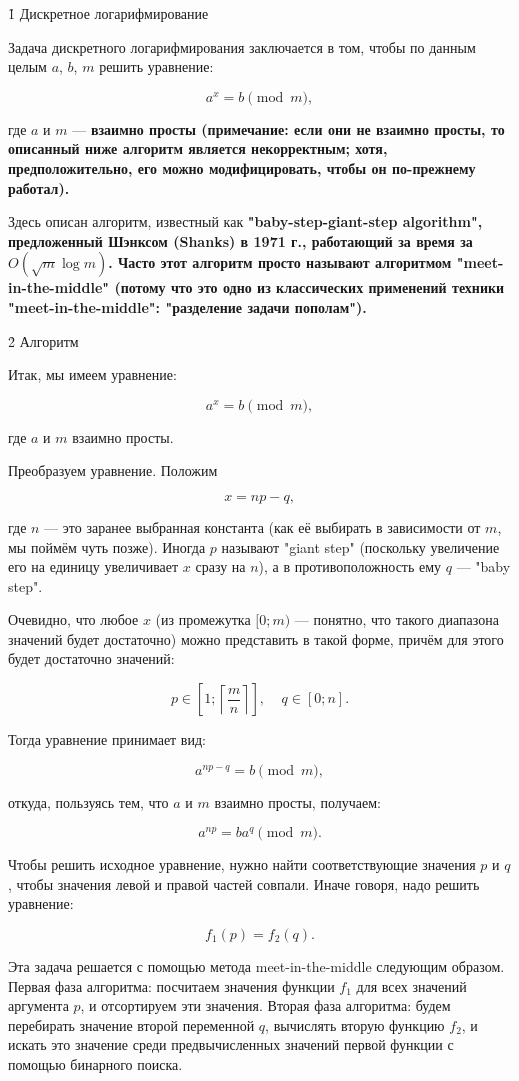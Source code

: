\h1{ Дискретное логарифмирование }

Задача дискретного логарифмирования заключается в том, чтобы по данным целым $a$, $b$, $m$ решить уравнение:

$$ a^x = b \pmod m, $$

где $a$ и $m$ --- \bf{взаимно просты} (примечание: если они не взаимно просты, то описанный ниже алгоритм является некорректным; хотя, предположительно, его можно модифицировать, чтобы он по-прежнему работал).

Здесь описан алгоритм, известный как \bf{"baby-step-giant-step algorithm"}, предложенный \bf{Шэнксом (Shanks)} в 1971 г., работающий за время за $O (\sqrt{m} \log m)$. Часто этот алгоритм просто называют алгоритмом \bf{"meet-in-the-middle"} (потому что это одно из классических применений техники "meet-in-the-middle": "разделение задачи пополам").


\h2{ Алгоритм }

Итак, мы имеем уравнение:

$$ a^x = b \pmod m, $$

где $a$ и $m$ взаимно просты.

Преобразуем уравнение. Положим

$$ x = np - q, $$

где $n$ --- это заранее выбранная константа (как её выбирать в зависимости от $m$, мы поймём чуть позже). Иногда $p$ называют "giant step" (поскольку увеличение его на единицу увеличивает $x$ сразу на $n$), а в противоположность ему $q$ --- "baby step".

Очевидно, что любое $x$ (из промежутка $[0;m)$ --- понятно, что такого диапазона значений будет достаточно) можно представить в такой форме, причём для этого будет достаточно значений:

$$ p \in \left[ 1; \left\lceil \frac{m}{n} \right\rceil \right], ~~~~~ q \in [0;n]. $$

Тогда уравнение принимает вид:

$$ a^{np-q} = b \pmod m, $$

откуда, пользуясь тем, что $a$ и $m$ взаимно просты, получаем:

$$ a^{np} = b a^q \pmod m. $$

Чтобы решить исходное уравнение, нужно найти соответствующие значения $p$ и $q$, чтобы значения левой и правой частей совпали. Иначе говоря, надо решить уравнение:

$$ f_1(p) = f_2(q). $$

Эта задача решается с помощью метода meet-in-the-middle следующим образом.  Первая фаза алгоритма: посчитаем значения функции $f_1$ для всех значений аргумента $p$, и отсортируем эти значения. Вторая фаза алгоритма: будем перебирать значение второй переменной $q$, вычислять вторую функцию $f_2$, и искать это значение среди предвычисленных значений первой функции с помощью бинарного поиска.


